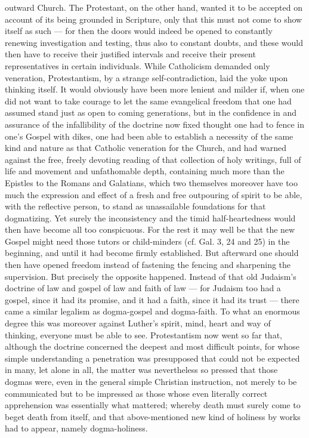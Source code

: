 \documentclass[12pt,a4paper,openany]{book}
\newcommand{\opage}[1]{\marginnote{\footnotesize\textit{[#1]}}}
\begin{document}
outward Church. The Protestant, on the other hand, wanted it to be accepted on
account of its being grounded in Scripture, only that this must not come to show
itself as such --- for then the doors would indeed be opened to constantly renewing
investigation and testing, thus also to constant doubts, and these would then have
to receive their justified intervals and receive their present representatives in
certain individuals. While Catholicism demanded only veneration, Protestantism, by a
strange self-contradiction, laid the yoke upon thinking itself. It would obviously
have been more lenient and milder if, when one did not want to take courage to let
the same evangelical freedom that one had assumed stand just as open to coming
generations, but in the confidence in and assurance of the infallibility of the
doctrine now fixed thought one had to fence in one's Gospel with dikes, one had been
able to establish a necessity of the same kind and nature as that Catholic
veneration for the Church, and had warned against the free, freely devoting reading
of that collection of holy writings, full of life and movement and unfathomable
depth, containing much more than the Epistles to the Romans and Galatians, which two
themselves moreover have too much the expression and effect of a fresh and free
outpouring of spirit to be able, with
\setcounter{footnote}{0}%
\opage{135}the reflective person, to stand as unassailable foundations for that dogmatizing.
Yet surely the inconsistency and the timid half-heartedness would then have become
all too conspicuous. For the rest it may well be that the new Gospel might need those
tutors or child-minders (cf. Gal. 3, 24 and 25) in the beginning, and until it had
become firmly established. But afterward one should then have opened freedom instead
of fastening the fencing and sharpening the supervision. But precisely the opposite
happened. Instead of that old Judaism's doctrine of law and gospel of law and faith
of law --- for Judaism too had a gospel, since it had its promise, and it had a
faith, since it had its trust --- there came a similar legalism as dogma-gospel and
dogma-faith. To what an enormous degree this was moreover against Luther's spirit,
mind, heart and way of thinking, everyone must be able to see. Protestantism now
went so far that, although the doctrine concerned the deepest and most difficult
points, for whose simple understanding a penetration was presupposed that could not
be expected in many, let alone in all, the matter was nevertheless so pressed that
those dogmas were, even in the general simple Christian instruction, not merely to
be communicated but to be impressed as those whose even literally correct
apprehension was essentially what mattered; whereby death must surely come to beget
death from itself, and that above-mentioned new kind of holiness by works had to
appear, namely dogma-holiness.
\end{document}
